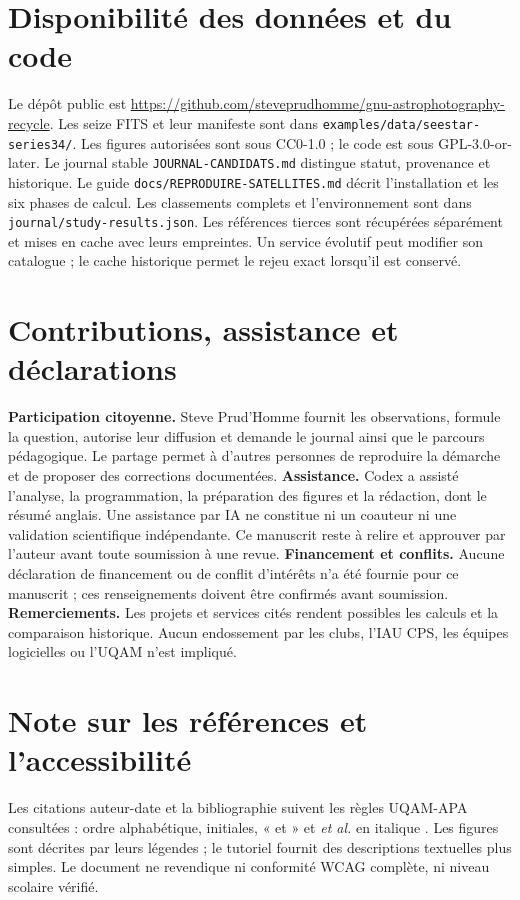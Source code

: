 \documentclass[11pt,letterpaper]{article}
\begin{document}
\section*{Disponibilité des données et du code}
Le dépôt public est \url{https://github.com/steveprudhomme/gnu-astrophotography-recycle}.
Les seize FITS et leur manifeste sont dans \texttt{examples/data/seestar-series34/}.
Les figures autorisées sont sous CC0-1.0 ; le code est sous GPL-3.0-or-later.
Le journal stable \texttt{JOURNAL-CANDIDATS.md} distingue statut, provenance et historique.
Le guide \texttt{docs/REPRODUIRE-SATELLITES.md} décrit l’installation et les six phases de calcul.
Les classements complets et l’environnement sont dans \texttt{journal/study-results.json}.
Les références tierces sont récupérées séparément et mises en cache avec leurs empreintes.
Un service évolutif peut modifier son catalogue ; le cache historique permet le rejeu exact lorsqu’il est conservé.

\section*{Contributions, assistance et déclarations}
\textbf{Participation citoyenne.} Steve Prud’Homme fournit les observations, formule la question, autorise leur diffusion et demande le journal ainsi que le parcours pédagogique.
Le partage permet à d’autres personnes de reproduire la démarche et de proposer des corrections documentées.
\textbf{Assistance.} Codex a assisté l’analyse, la programmation, la préparation des figures et la rédaction, dont le résumé anglais.
Une assistance par IA ne constitue ni un coauteur ni une validation scientifique indépendante.
Ce manuscrit reste à relire et approuver par l’auteur avant toute soumission à une revue.
\textbf{Financement et conflits.} Aucune déclaration de financement ou de conflit d’intérêts n’a été fournie pour ce manuscrit ; ces renseignements doivent être confirmés avant soumission.
\textbf{Remerciements.} Les projets et services cités rendent possibles les calculs et la comparaison historique.
Aucun endossement par les clubs, l’IAU CPS, les équipes logicielles ou l’UQAM n’est impliqué.

\section*{Note sur les références et l’accessibilité}
Les citations auteur-date et la bibliographie suivent les règles UQAM-APA consultées : ordre alphabétique, initiales, « et » et \textit{et al.} en italique \parencite{uqam}.
Les figures sont décrites par leurs légendes ; le tutoriel fournit des descriptions textuelles plus simples.
Le document ne revendique ni conformité WCAG complète, ni niveau scolaire vérifié.

\clearpage
\printbibliography[title={Références}]
\end{document}

